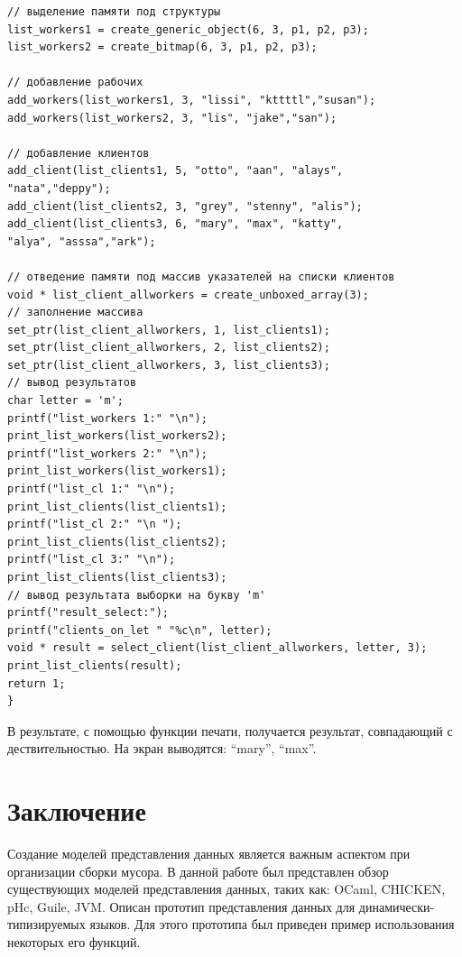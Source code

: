 \documentclass[12pt,a4paper]{article}
\begin{document}
\begin{lstlisting}
// выделение памяти под структуры
list_workers1 = create_generic_object(6, 3, p1, p2, p3);
list_workers2 = create_bitmap(6, 3, p1, p2, p3);

// добавление рабочих
add_workers(list_workers1, 3, "lissi", "kttttl","susan");
add_workers(list_workers2, 3, "lis", "jake","san");

// добавление клиентов
add_client(list_clients1, 5, "otto", "aan", "alays",
"nata","deppy");
add_client(list_clients2, 3, "grey", "stenny", "alis");
add_client(list_clients3, 6, "mary", "max", "katty",
"alya", "asssa","ark");

// отведение памяти под массив указателей на списки клиентов
void * list_client_allworkers = create_unboxed_array(3);
// заполнение массива
set_ptr(list_client_allworkers, 1, list_clients1);
set_ptr(list_client_allworkers, 2, list_clients2);
set_ptr(list_client_allworkers, 3, list_clients3);
// вывод результатов
char letter = 'm';
printf("list_workers 1:" "\n");
print_list_workers(list_workers2);
printf("list_workers 2:" "\n");
print_list_workers(list_workers1);
printf("list_cl 1:" "\n");
print_list_clients(list_clients1);
printf("list_cl 2:" "\n ");
print_list_clients(list_clients2);
printf("list_cl 3:" "\n");
print_list_clients(list_clients3);
// вывод результата выборки на букву 'm'
printf("result_select:");
printf("clients_on_let " "%c\n", letter);
void * result = select_client(list_client_allworkers, letter, 3);
print_list_clients(result);
return 1;
}
\end{lstlisting}
В результате, с помощью функции печати, получается результат, совпадающий с дествительностью. На экран выводятся: ``mary'', ``max''.


\newpage
\section*{Заключение}

Создание моделей представления данных является важным аспектом при организации сборки мусора. В данной работе был представлен
обзор существующих моделей представления данных, таких как: OCaml, CHICKEN, pHc, Guile, JVM. Описан прототип представления данных для динамически-типизируемых
языков. Для этого прототипа был приведен пример использования некоторых его функций.
\newpage


\end{document}
